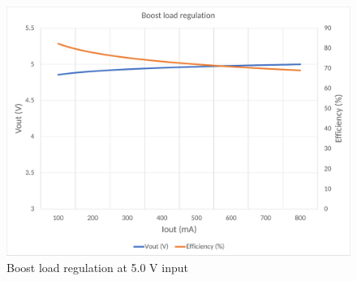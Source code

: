 \begin{figure}[H]
	\centering
	\includegraphics[width=\columnwidth]{IMGS/Boost load regulation at 5V Vin.pdf}
	\caption{Boost load regulation at 5.0 V input}
	\label{fig:arch}
\end{figure}

